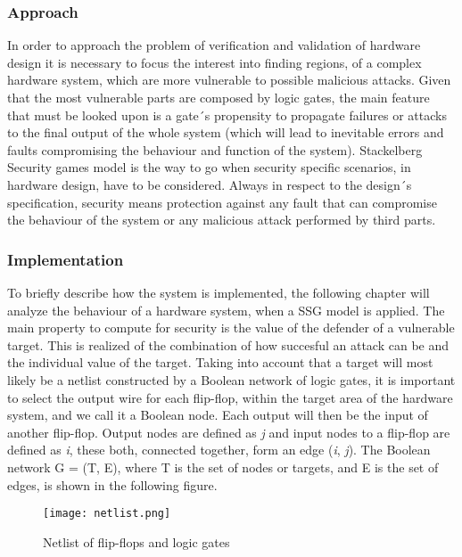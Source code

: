 \documentclass[conference]{IEEEtran}
\begin{document}
\subsubsection{Approach}
In order to approach the problem of verification and validation of hardware design it is necessary to focus the interest into finding regions, of a complex hardware system, which are more vulnerable to possible malicious attacks. Given that the most vulnerable parts are composed by logic gates, the main feature that must be looked upon is a gate´s propensity to propagate failures or attacks to the final output of the whole system (which will lead to inevitable errors and faults compromising the behaviour and function of the system).
Stackelberg Security games model is the way to go when security specific scenarios, in hardware design, have to be considered. Always in respect to the design´s specification, security means protection against any fault that can compromise the behaviour of the system or any malicious attack performed by third parts.
\subsubsection{Implementation}
To briefly describe how the system is implemented, the following chapter will analyze the behaviour of a hardware system, when a SSG model is applied.
The main property to compute for security is the value of the defender of a vulnerable target. This is realized of the combination of how succesful an attack can be and the individual value of the target. Taking into account that a target will most likely be a netlist constructed by a Boolean network of logic gates, it is important to select the output wire for each flip-flop, within the target area of the hardware system, and we call it a Boolean node. Each output will then be the input of another flip-flop. Output nodes are defined as \textit{j} and input nodes to a flip-flop are defined as \textit{i}, these both, connected together, form an edge (\textit{i}, \textit{j}). The Boolean network G = (T, E), where T is the set of nodes or targets, and E is the set of edges, is shown in the following figure.
\begin{figure}[h]
    \centerline{\texttt{[image: netlist.png]}}
    \caption{Netlist of flip-flops and logic gates}
    \label{netlist}
\end{figure} 
\end{document}
